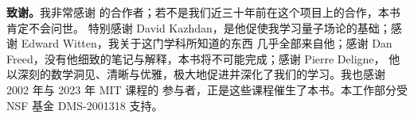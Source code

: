 {\bf 致谢。}我非常感谢 \cite{QFS} 的合作者；若不是我们近三十年前在这个项目上的合作，本书肯定不会问世。
特别感谢 David Kazhdan，是他促使我学习量子场论的基础；感谢 Edward Witten，我关于这门学科所知道的东西
几乎全部来自他；感谢 Dan Freed，没有他细致的笔记与解释，本书将不可能完成；感谢 Pierre Deligne，
他以深刻的数学洞见、清晰与优雅，极大地促进并深化了我们的学习。我也感谢 2002 年与 2023 年 MIT 课程的
参与者，正是这些课程催生了本书。本工作部分受 NSF 基金 DMS-2001318 支持。

